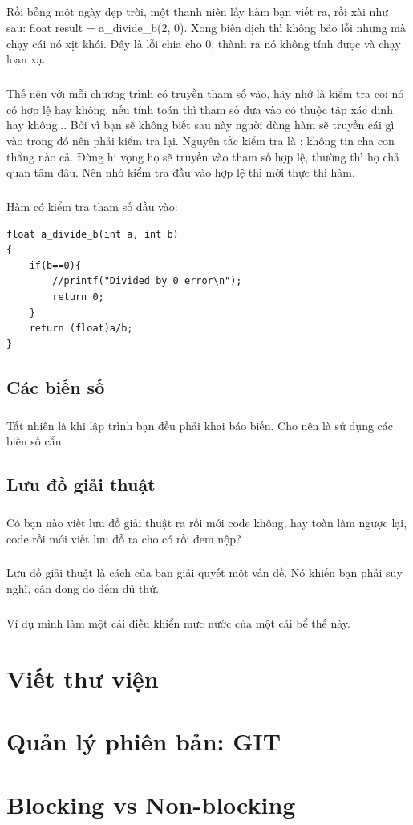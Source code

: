 \documentclass[12pt,a5paper]{book}
\begin{document}
\paragraph{}
Rồi bỗng một ngày đẹp trời, một thanh niên lấy hàm bạn viết ra, rồi xài như sau: float result = a\_divide\_b(2, 0). Xong biên dịch thì không báo lỗi nhưng mà chạy cái nó xịt khói. Đây là lỗi chia cho 0, thành ra nó không tính được và chạy loạn xạ.
\paragraph{}
Thế nên với mỗi chương trình có truyền tham số vào, hãy nhớ là kiểm tra coi nó có hợp lệ hay không, nếu tính toán thì tham số đưa vào có thuộc tập xác định hay không... Bởi vì bạn sẽ không biết sau này người dùng hàm sẽ truyền cái gì vào trong đó nên phải kiểm tra lại. Nguyên tắc kiểm tra là : không tin cha con thằng nào cả. Đừng hi vọng họ sẽ truyền vào tham số hợp lệ, thường thì họ chả quan tâm đâu. Nên nhớ kiểm tra đầu vào hợp lệ thì mới thực thi hàm.
\paragraph{}
Hàm có kiểm tra tham số đầu vào:
\begin{lstlisting}
float a_divide_b(int a, int b)
{
	if(b==0){
		//printf("Divided by 0 error\n");
		return 0;
	}
	return (float)a/b;
}
\end{lstlisting}

\section{Các biến số}
\paragraph{}
Tất nhiên là khi lập trình bạn đều phải khai báo biến. Cho nên là sử dụng các biến số cẩn.
\section{Lưu đồ giải thuật}
\paragraph{}
Có bạn nào viết lưu đồ giải thuật ra rồi mới code không, hay toàn làm ngược lại, code rồi mới viết lưu đồ ra cho có rồi đem nộp?
\paragraph{}
Lưu đồ giải thuật là cách của bạn giải quyết một vấn đề. Nó khiến bạn phải suy nghĩ, cân đong đo đếm đủ thứ.
\paragraph{}
Ví dụ mình làm một cái điều khiển mực nước của một cái bể thế này.

\chapter{Viết thư viện}
\chapter{Quản lý phiên bản: GIT}

\chapter{Blocking vs Non-blocking}
\end{document}
